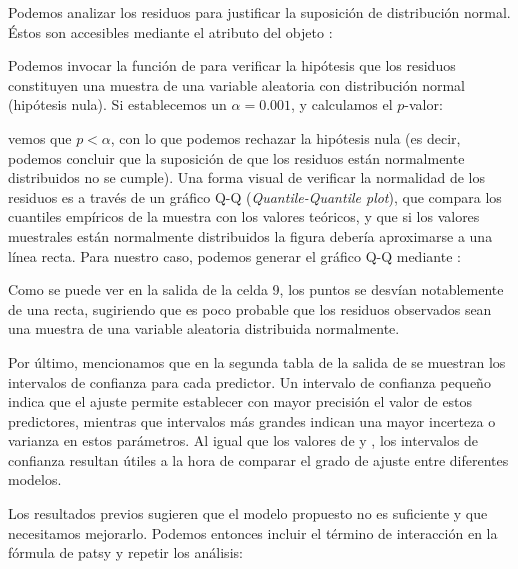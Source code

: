 Podemos analizar los residuos para justificar la suposición de distribución normal. Éstos son accesibles mediante el atributo  del objeto :


Podemos invocar la función  de  para verificar la hipótesis que los residuos constituyen una muestra de una variable aleatoria con distribución normal (hipótesis nula). Si establecemos un $\alpha = 0.001$, y calculamos el $p$-valor:


\noindent vemos que $p < \alpha$, con lo que podemos rechazar la hipótesis nula (es decir, podemos concluir que la suposición de que los residuos están normalmente distribuidos no se cumple). Una forma visual de verificar la normalidad de los residuos es a través de un gráfico Q-Q (\textit{Quantile-Quantile plot}), que compara los cuantiles empíricos de la muestra con los valores teóricos, y que si los valores muestrales están normalmente distribuidos la figura debería aproximarse a una línea recta. Para nuestro caso, podemos generar el gráfico Q-Q mediante :


Como se puede ver en la salida de la celda 9, los puntos se desvían notablemente de una recta, sugiriendo que es poco probable que los residuos observados sean una muestra de una variable aleatoria distribuida normalmente. 

Por último, mencionamos que en la segunda tabla de la salida de  se muestran los intervalos de confianza para cada predictor. Un intervalo de confianza pequeño indica que el ajuste permite establecer con mayor precisión el valor de estos predictores, mientras que intervalos más grandes indican una mayor incerteza o varianza en estos parámetros. Al igual que los valores de  y , los intervalos de confianza resultan útiles a la hora de comparar el grado de ajuste entre diferentes modelos.

Los resultados previos sugieren que el modelo propuesto no es suficiente y que necesitamos mejorarlo. Podemos entonces incluir el término de interacción en la fórmula de patsy y repetir los análisis:



